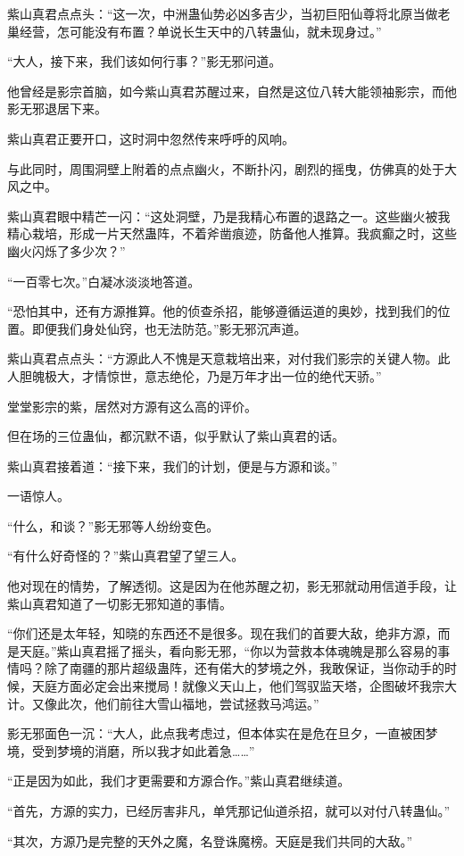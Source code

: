 \begin{this_body}
紫山真君点点头：“这一次，中洲蛊仙势必凶多吉少，当初巨阳仙尊将北原当做老巢经营，怎可能没有布置？单说长生天中的八转蛊仙，就未现身过。”

“大人，接下来，我们该如何行事？”影无邪问道。

他曾经是影宗首脑，如今紫山真君苏醒过来，自然是这位八转大能领袖影宗，而他影无邪退居下来。

紫山真君正要开口，这时洞中忽然传来呼呼的风响。

与此同时，周围洞壁上附着的点点幽火，不断扑闪，剧烈的摇曳，仿佛真的处于大风之中。

紫山真君眼中精芒一闪：“这处洞壁，乃是我精心布置的退路之一。这些幽火被我精心栽培，形成一片天然蛊阵，不着斧凿痕迹，防备他人推算。我疯癫之时，这些幽火闪烁了多少次？”

“一百零七次。”白凝冰淡淡地答道。

“恐怕其中，还有方源推算。他的侦查杀招，能够遵循运道的奥妙，找到我们的位置。即便我们身处仙窍，也无法防范。”影无邪沉声道。

紫山真君点点头：“方源此人不愧是天意栽培出来，对付我们影宗的关键人物。此人胆魄极大，才情惊世，意志绝伦，乃是万年才出一位的绝代天骄。”

堂堂影宗的紫，居然对方源有这么高的评价。

但在场的三位蛊仙，都沉默不语，似乎默认了紫山真君的话。

紫山真君接着道：“接下来，我们的计划，便是与方源和谈。”

一语惊人。

“什么，和谈？”影无邪等人纷纷变色。

“有什么好奇怪的？”紫山真君望了望三人。

他对现在的情势，了解透彻。这是因为在他苏醒之初，影无邪就动用信道手段，让紫山真君知道了一切影无邪知道的事情。

“你们还是太年轻，知晓的东西还不是很多。现在我们的首要大敌，绝非方源，而是天庭。”紫山真君摇了摇头，看向影无邪，“你以为营救本体魂魄是那么容易的事情吗？除了南疆的那片超级蛊阵，还有偌大的梦境之外，我敢保证，当你动手的时候，天庭方面必定会出来搅局！就像义天山上，他们驾驭监天塔，企图破坏我宗大计。又像此次，他们前往大雪山福地，尝试拯救马鸿运。”

影无邪面色一沉：“大人，此点我考虑过，但本体实在是危在旦夕，一直被困梦境，受到梦境的消磨，所以我才如此着急……”

“正是因为如此，我们才更需要和方源合作。”紫山真君继续道。

“首先，方源的实力，已经厉害非凡，单凭那记仙道杀招，就可以对付八转蛊仙。”

“其次，方源乃是完整的天外之魔，名登诛魔榜。天庭是我们共同的大敌。”


\end{this_body}

